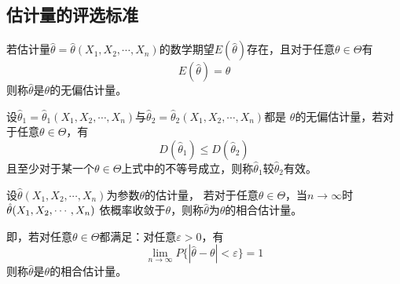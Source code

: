 \subsection{估计量的评选标准}
\begin{definition}[无偏性]
    若估计量$\hat{\theta}=\hat{\theta}(X_1,X_2,\cdots,X_n)$的数学期望$E(\hat{\theta})$存在，且对于任意$\theta\in \varTheta$有
    $$E(\hat{\theta})=\theta$$
    则称$\hat{\theta}$是$\theta$的{\heiti 无偏估计量}。
\end{definition}

\begin{definition}[有效性]
    设$\hat{\theta}_1=\hat{\theta}_1(X_1,X_2,\cdots,X_n)$与$\hat{\theta}_2=\hat{\theta}_2(X_1,X_2,\cdots,X_n)$都是
    $\theta$的无偏估计量，若对于任意$\theta\in \varTheta$，有
    $$D(\hat{\theta}_1)\leq D(\hat{\theta}_2)$$
    且至少对于某一个$\theta\in \varTheta$上式中的不等号成立，则称$\hat{\theta}_1$较$\hat{\theta}_2${\heiti 有效}。
\end{definition}

\begin{definition}[相合性]
    设$\hat{\theta}(X_1,X_2,\cdots,X_n)$为参数$\theta$的估计量，
    若对于任意$\theta\in \varTheta$，当$n \to \infty$时$\hat{\theta}(X_1,\\X_2,\cdots,X_n)$
    依概率收敛于$\theta$，则称$\hat{\theta}$为$\theta$的{\heiti 相合估计量}。

    即，若对任意$\theta\in \varTheta$都满足：对任意$\varepsilon>0$，有
    $$\lim_{n\to\infty} P\{|\hat{\theta}-\theta|<\varepsilon\}=1$$
    则称$\hat{\theta}$是$\theta$的{\heiti 相合估计量}。
\end{definition}
